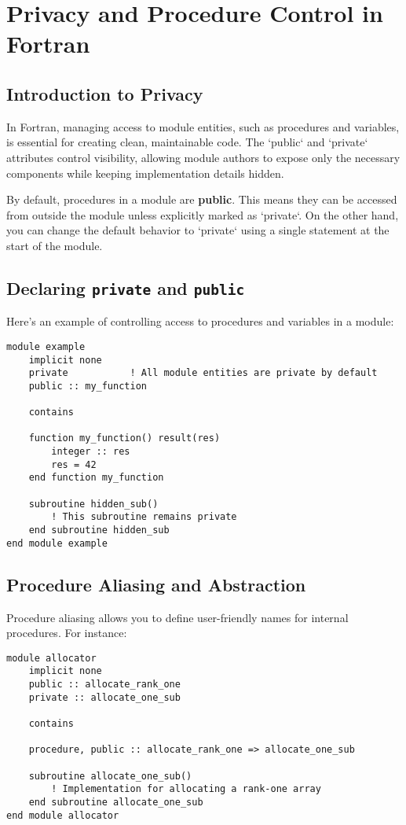 \chapter{Privacy and Procedure Control in Fortran}

\section{Introduction to Privacy}
In Fortran, managing access to module entities, such as procedures and variables, is essential for creating clean, maintainable code. The `public` and `private` attributes control visibility, allowing module authors to expose only the necessary components while keeping implementation details hidden.

By default, procedures in a module are \textbf{public}. This means they can be accessed from outside the module unless explicitly marked as `private`. On the other hand, you can change the default behavior to `private` using a single statement at the start of the module.

\section{Declaring \texttt{private} and \texttt{public}}
Here's an example of controlling access to procedures and variables in a module:

\begin{lstlisting}
module example
    implicit none
    private           ! All module entities are private by default
    public :: my_function

    contains

    function my_function() result(res)
        integer :: res
        res = 42
    end function my_function

    subroutine hidden_sub()
        ! This subroutine remains private
    end subroutine hidden_sub
end module example
\end{lstlisting}

\section{Procedure Aliasing and Abstraction}
Procedure aliasing allows you to define user-friendly names for internal procedures. For instance:

\begin{lstlisting}
module allocator
    implicit none
    public :: allocate_rank_one
    private :: allocate_one_sub

    contains

    procedure, public :: allocate_rank_one => allocate_one_sub

    subroutine allocate_one_sub()
        ! Implementation for allocating a rank-one array
    end subroutine allocate_one_sub
end module allocator
\end{lstlisting}

